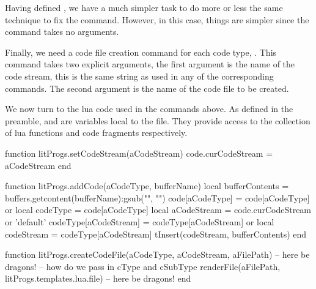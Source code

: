 Having defined \type{\fixStartLitProgs}, we have a much simpler task to do 
more or less the same technique to fix the \type{\stopXXX} command. 
However, in this case, things are simpler since the \type{\stopXXX} 
command takes no arguments. 

\startMkIVCode
\def\fixStopLitProgs#1{%
  \letvalue{oldStop#1}=\getvalue{stop#1}%
  \setvalue{stop#1}{%
    \getvalue{oldStop#1}%
    \directlua{
      thirddata.literateProgs.addCode(
        '#1',
        '_typing_'
      )
    }
  }
}
\stopMkIVCode




Finally, we need a code file creation command for each code type, 
\type{\createXXXFile}. This command takes two explicit arguments, the 
first argument is the name of the code stream, this is the same string as 
used in any of the corresponding \type{\startXXX} commands. The second 
argument is the name of the code file to be created. 

\startMkIVCode
\def\callCreateCodeFile#1#2#3{%
  \directlua{
    thirddata.literateProgs.createCodeFile(
      '#1',
      '#2',
      '#3'
    )
  }
}
\def\defineLitProgsCreateFile#1{%
  \setevalue{create#1File}{%
    \noexpand\callCreateCodeFile #1
  }
}
\stopMkIVCode

We now turn to the lua code used in the \type{\directlua} commands above. 
As defined in the preamble,  and  are variables 
local to the  file. They provide access to the 
collection of lua functions and code fragments respectively. 

\startLuaCode
function litProgs.setCodeStream(aCodeStream)
  code.curCodeStream = aCodeStream
end

function litProgs.addCode(aCodeType, bufferName)
  local bufferContents  =
    buffers.getcontent(bufferName):gsub("", "\n")
  code[aCodeType]       = code[aCodeType] or { }
  local codeType        = code[aCodeType]
  local aCodeStream     = code.curCodeStream or 'default'
  codeType[aCodeStream] = codeType[aCodeStream] or { }
  local codeStream      = codeType[aCodeStream]
  tInsert(codeStream, bufferContents)
end

function litProgs.createCodeFile(aCodeType,
                                 aCodeStream,
                                 aFilePath)
  -- here be dragons! -- how do we pass in cType and cSubType
  renderFile(aFilePath, litProgs.templates.lua.file)
  -- here be dragons!
end
\stopLuaCode

\stopchapter